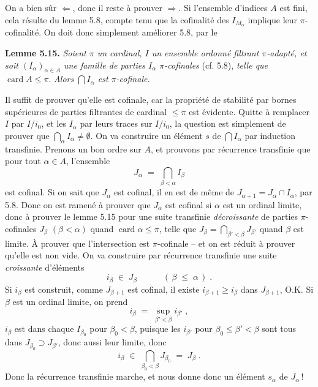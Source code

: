 \documentclass[11pt]{article}
\newcommand{\printedpage}[1]{\marginpar{\raggedright\footnotesize p.~#1}}
\newcommand{\msp}[1]{\marginpar{\raggedright\footnotesize [#1]}}
\newcommand{\card}{\operatorname{card}}
\begin{document}
\msp{page 70}
On a bien sûr $\Longleftarrow$, donc il reste à prouver $\Longrightarrow$. Si l'ensemble d'indices $A$ est fini, cela résulte du lemme 5.8, compte tenu que la cofinalité des $I_{M_{\alpha}}$ implique leur $\pi$-cofinalité. On doit donc simplement améliorer 5.8, par le

\printedpage{40}

\textbf{Lemme 5.15.} \textit{Soient $\pi$ un cardinal, $I$ un ensemble ordonné filtrant $\pi$-adapté, et soit $(I_{\alpha})_{\alpha\in A}$ une famille de parties $I_{\alpha}$ $\pi$-cofinales} (cf. 5.8), \textit{telle que} $\card A \leq \pi$. \textit{Alors $\bigcap I_{\alpha}$ est $\pi$-cofinale.}

Il suffit de prouver qu'elle est cofinale, car la propriété de stabilité par bornes supérieures de parties filtrantes de cardinal $\leq \pi$ est évidente. Quitte à remplacer $I$ par $I/i_{0}$, et les $I_{\alpha}$ par leurs traces sur $I/i_{0}$, la question est simplement de prouver que $\bigcap_{\alpha} I_{\alpha} \neq \emptyset$. On va construire un élément $s$ de $\bigcap I_{\alpha}$ par induction transfinie. Prenons un bon ordre sur $A$, et prouvons par récurrence transfinie
\msp{page 71}
que pour tout $\alpha \in A$, l'ensemble
\[
J_{\alpha} \;=\; \bigcap_{\beta<\alpha} I_{\beta}
\]
est cofinal. Si on sait que $J_{\alpha}$ est cofinal, il en est de même de $J_{\alpha+1} = J_{\alpha} \cap I_{\alpha}$, par 5.8. Donc on est ramené à prouver que $J_{\alpha}$ est cofinal si $\alpha$ est un ordinal limite, donc à prouver le lemme 5.15 pour une suite transfinie \textit{décroissante} de parties $\pi$-cofinales $J_{\beta}$ $(\beta < \alpha)$ quand $\card \alpha \leq \pi$, telle que $J_{\beta} = \bigcap_{\beta'<\beta} J_{\beta'}$ quand $\beta$ est limite. À prouver que l'intersection est $\pi$-cofinale -- et on est réduit à prouver qu'elle est non vide. On va construire par récurrence transfinie une suite \textit{croissante} d'éléments
\[
i_{\beta} \;\in\; J_{\beta} \qquad\quad (\, \beta \;\leq\; \alpha \,) \; .
\]
Si $i_{\beta}$ est construit, comme $J_{\beta+1}$ est cofinal, il existe $i_{\beta+1} \geq i_{\beta}$ dans $J_{\beta+1}$, O.K. Si $\beta$ est un ordinal limite, on prend
\[
i_{\beta} \;=\; \sup_{\beta'<\beta} i_{\beta'} \; ,
\]
$i_{\beta}$ est dans chaque $I_{\beta_{0}}$ pour $\beta_{0} < \beta$,
\msp{page 72}
puisque les $i_{\beta'}$ pour $\beta_{0} \leq \beta' < \beta$ sont tous dans $J_{\beta_{0}} \supset J_{\beta'}$, donc aussi leur limite, donc
\[
i_{\beta} \;\in\; \bigcap_{\beta_{0}<\beta} J_{\beta_{0}} \;=\; J_{\beta} \; .
\]
Donc la récurrence transfinie marche, et nous donne donc un élément $s_{\alpha}$ de $J_{\alpha}$\,!
\end{document}
